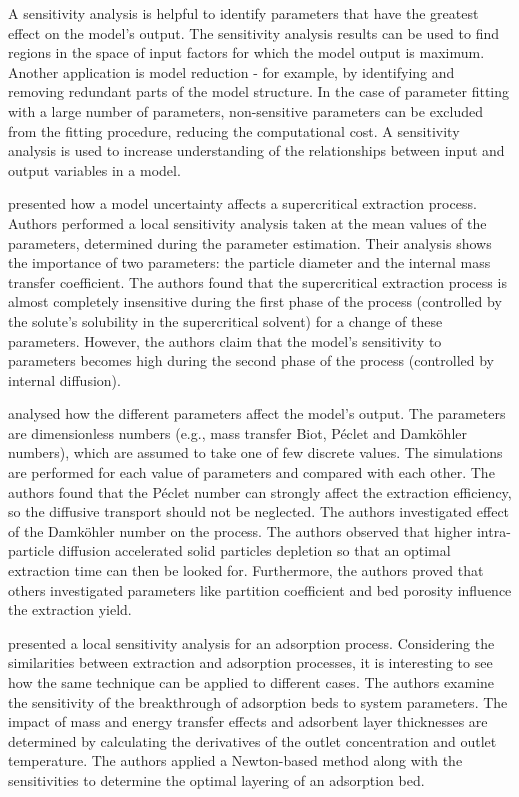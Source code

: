 \documentclass[a4paper,fleqn]{cas-dc}
\begin{document}
{\color{blue}A sensitivity analysis is helpful to identify parameters that have the greatest effect on the model's output. The sensitivity analysis results can be used to find regions in the space of input factors for which the model output is maximum. Another application is model reduction - for example, by identifying and removing redundant parts of the model structure. In the case of parameter fitting with a large number of parameters, non-sensitive parameters can be excluded from the fitting procedure, reducing the computational cost. A sensitivity analysis is used to increase understanding of the relationships between input and output variables in a model.
	
\citet{Fiori_2007} presented how a model uncertainty affects a supercritical extraction process. Authors performed a local sensitivity analysis taken at the mean values of the parameters, determined during the parameter estimation. Their analysis shows the importance of two parameters: the particle diameter and the internal mass transfer coefficient. The authors found that the supercritical extraction process is almost completely insensitive during the first phase of the process (controlled by the solute's solubility in the supercritical solvent) for a change of these parameters. However, the authors claim that the model's sensitivity to parameters becomes high during the second phase of the process (controlled by internal diffusion).

\citet{Rabi_2019} analysed how the different parameters affect the model's output. The parameters are dimensionless numbers (e.g., mass transfer Biot, Péclet and Damköhler numbers), which are assumed to take one of few discrete values. The simulations are performed for each value of parameters and compared with each other. The authors found that the Péclet number can strongly affect the extraction efficiency, so the diffusive transport should not be neglected. The authors investigated effect of the Damköhler number on the process. The authors observed that higher intra-particle diffusion accelerated solid particles depletion so that an optimal extraction time can then be looked for. Furthermore, the authors proved that others investigated parameters like partition coefficient and bed porosity influence the extraction yield. 

\citet{Glover2008} presented a local sensitivity analysis for an adsorption process. Considering the similarities between extraction and adsorption processes, it is interesting to see how the same technique can be applied to different cases. The authors examine the sensitivity of the breakthrough of adsorption beds to system parameters. The impact of mass and energy transfer effects and adsorbent layer thicknesses are determined by calculating the derivatives of the outlet concentration and outlet temperature. The authors applied a Newton-based method along with the sensitivities to determine the optimal layering of an adsorption bed.}
\end{document}
